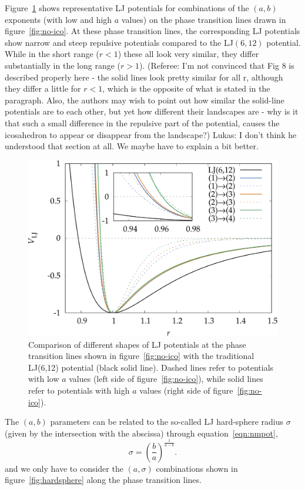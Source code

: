 Figure~\ref{fig:compareLJ} shows representative LJ potentials for combinations
of the $(a,b)$ exponents (with low and high $a$ values) on the phase transition
lines drawn in figure~\ref{fig:no-ico}. At these phase transition lines, the
corresponding LJ potentials show narrow and steep repulsive potentials compared
to the LJ$(6,12)$ potential.  While in the short range ($r<1$) these all look
very similar, they differ substantially in the long range ($r>1$).
{\color{red} (Referee: I'm not convinced that Fig 8 is described properly here - the solid lines look pretty similar for all r, although they differ a little for $r<1$, which is the opposite of what is stated in the paragraph. Also, the authors may wish to point out how similar the solid-line potentials are to each other, but yet how different their landscapes are - why is it that such a small difference in the repulsive part of the potential, causes the icosahedron to appear or disappear from the landscape?)
}
{\color{blue}Lukas: I don't think he understood that section at all. We maybe have to explain a bit better.}
\begin{figure}[htb]\centering
    \includegraphics[width=.8\columnwidth]{gregory-newton/compareLJ.pdf}
    \caption{Comparison of different shapes of LJ potentials at the phase
    transition lines shown in figure~\ref{fig:no-ico} with the traditional
    LJ(6,12) potential (black solid line). Dashed lines refer to potentials
    with low $a$ values (left side of figure~\ref{fig:no-ico}), while solid lines
    refer to potentials with high $a$ values (right side of
    figure~\ref{fig:no-ico}).}
    \label{fig:compareLJ}
\end{figure}

The $(a,b)$ parameters can be related to the so-called LJ hard-sphere radius $\sigma$ (given by the
intersection with the abscissa) through equation~\eqref{eqn:nmpot}, 
\begin{equation}
    \sigma=\left(\frac{b}{a}\right)^{\frac{1}{a-b}}.
\end{equation}
and we only have to consider the $(a,\sigma)$ combinations shown in  
figure~\ref{fig:hardsphere} along the phase transition lines.

